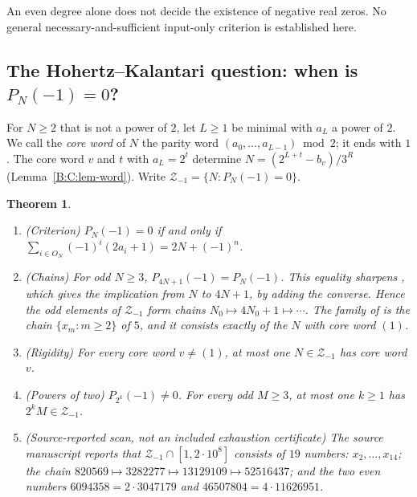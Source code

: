 \documentclass[11pt,a4paper]{article}
\newtheorem{theorem}{Theorem}[section]
\theoremstyle{definition}
\theoremstyle{remark}
\numberwithin{equation}{section}
\begin{document}
An even degree alone does not decide the existence of negative real zeros.
No general necessary-and-sufficient input-only criterion is established here.

\subsection{The Hohertz--Kalantari question: when is \texorpdfstring{$P_N(-1)=0$}{P(-1)=0}?}\label{B:C:ssec-HK}

For $N\ge2$ that is not a power of $2$, let $L\ge1$ be minimal with $a_L$ a
power of $2$.  We call the \emph{core word} of $N$ the parity word
$(a_0,\dots,a_{L-1})\bmod2$; it ends with $1$.  The core word $v$ and $t$ with
$a_L=2^t$ determine $N=(2^{L+t}-b_v)/3^{R}$ (Lemma~\ref{B:C:lem-word}).  Write
$\mathcal Z_{-1}=\{N:P_N(-1)=0\}$.

\begin{theorem}\label{B:C:thm-minus1}
\leavevmode
\begin{enumerate}
\item (Criterion) $P_N(-1)=0$ if and only if
$\sum_{i\in O_N}(-1)^i(2a_i+1)=2N+(-1)^{n}$.
\item (Chains) For odd $N\ge3$, $P_{4N+1}(-1)=P_N(-1)$.  This equality sharpens
\cite[Lemma~11]{R025}, which gives the implication from $N$ to $4N+1$, by adding the
converse.  Hence the odd elements of
$\mathcal Z_{-1}$ form chains $N_0\mapsto4N_0+1\mapsto\cdots$.  The family of
\cite[Thm.~7]{R025} is the chain $\{x_m:m\ge2\}$ of $5$, and it consists
exactly of the $N$ with core word $(1)$.
\item (Rigidity) For every core word $v\ne(1)$, at most one $N\in\mathcal Z_{-1}$
has core word $v$.
\item (Powers of two) $P_{2^k}(-1)\ne0$.  For every odd $M\ge3$, at most one
$k\ge1$ has $2^kM\in\mathcal Z_{-1}$.
\item (Source-reported scan, not an included exhaustion certificate)
The source manuscript reports that $\mathcal Z_{-1}\cap[1,2\cdot10^8]$ consists of $19$ numbers:
$x_2,\dots,x_{14}$; the chain
$820569\mapsto3282277\mapsto13129109\mapsto52516437$; and the two even
numbers $6094358=2\cdot3047179$ and $46507804=4\cdot11626951$.
\end{enumerate}
\end{theorem}
\end{document}
